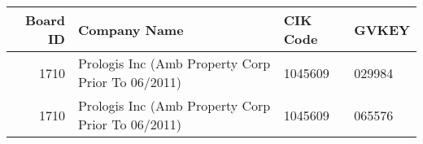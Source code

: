 

\begin{longtable}{ r l l l }\hline\hline
   Board ID &    Company Name &    CIK Code &    GVKEY\\ 
\hline\endhead
   1710 &    Prologis Inc (Amb Property Corp Prior To 06/2011) &    1045609 &    029984\\ 
   1710 &    Prologis Inc (Amb Property Corp Prior To 06/2011) &    1045609 &    065576\\ 
\hline\hline\end{longtable}

